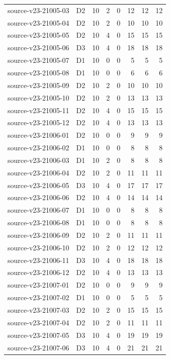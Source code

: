 \begin{longtable}{p{}lrrrrrr}
source-v23-21005-03 & D2 & 10 & 2 & 0 & 12 & 12 & 12\\
source-v23-21005-04 & D2 & 10 & 2 & 0 & 10 & 10 & 10\\
source-v23-21005-05 & D2 & 10 & 4 & 0 & 15 & 15 & 15\\
source-v23-21005-06 & D3 & 10 & 4 & 0 & 18 & 18 & 18\\
source-v23-21005-07 & D1 & 10 & 0 & 0 & 5 & 5 & 5\\
source-v23-21005-08 & D1 & 10 & 0 & 0 & 6 & 6 & 6\\
source-v23-21005-09 & D2 & 10 & 2 & 0 & 10 & 10 & 10\\
source-v23-21005-10 & D2 & 10 & 2 & 0 & 13 & 13 & 13\\
source-v23-21005-11 & D2 & 10 & 4 & 0 & 15 & 15 & 15\\
source-v23-21005-12 & D2 & 10 & 4 & 0 & 13 & 13 & 13\\
source-v23-21006-01 & D2 & 10 & 0 & 0 & 9 & 9 & 9\\
source-v23-21006-02 & D1 & 10 & 0 & 0 & 8 & 8 & 8\\
source-v23-21006-03 & D1 & 10 & 2 & 0 & 8 & 8 & 8\\
source-v23-21006-04 & D2 & 10 & 2 & 0 & 11 & 11 & 11\\
source-v23-21006-05 & D3 & 10 & 4 & 0 & 17 & 17 & 17\\
source-v23-21006-06 & D2 & 10 & 4 & 0 & 14 & 14 & 14\\
source-v23-21006-07 & D1 & 10 & 0 & 0 & 8 & 8 & 8\\
source-v23-21006-08 & D1 & 10 & 0 & 0 & 8 & 8 & 8\\
source-v23-21006-09 & D2 & 10 & 2 & 0 & 11 & 11 & 11\\
source-v23-21006-10 & D2 & 10 & 2 & 0 & 12 & 12 & 12\\
source-v23-21006-11 & D3 & 10 & 4 & 0 & 18 & 18 & 18\\
source-v23-21006-12 & D2 & 10 & 4 & 0 & 13 & 13 & 13\\
source-v23-21007-01 & D2 & 10 & 0 & 0 & 9 & 9 & 9\\
source-v23-21007-02 & D1 & 10 & 0 & 0 & 5 & 5 & 5\\
source-v23-21007-03 & D2 & 10 & 2 & 0 & 15 & 15 & 15\\
source-v23-21007-04 & D2 & 10 & 2 & 0 & 11 & 11 & 11\\
source-v23-21007-05 & D3 & 10 & 4 & 0 & 19 & 19 & 19\\
source-v23-21007-06 & D3 & 10 & 4 & 0 & 21 & 21 & 21\\

\end{longtable}
